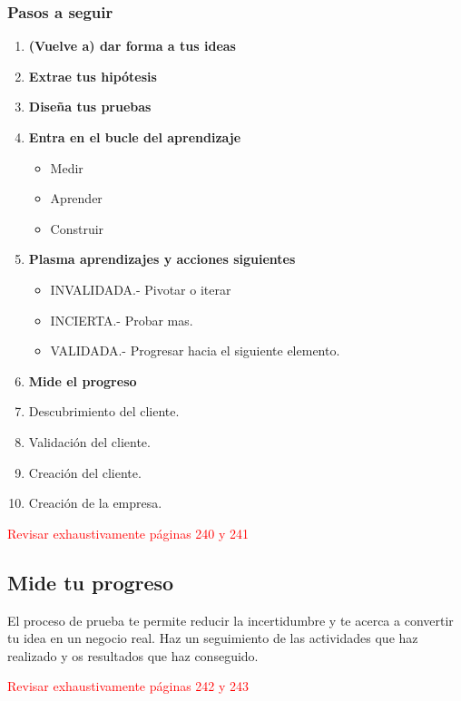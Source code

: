 \documentclass[11pt]{book}
\begin{document}
\subsubsection{Pasos a seguir}
\begin{enumerate}
\item \textbf{ (Vuelve a) dar forma a tus ideas }\\

\item \textbf{ Extrae tus hipótesis }\\

\item \textbf{ Diseña tus pruebas }\\

\item \textbf{ Entra en el bucle del aprendizaje }\\
\begin{itemize}
\item Medir
\item Aprender
\item Construir
\end{itemize}
\item \textbf{ Plasma aprendizajes y acciones siguientes }\\
\begin{itemize}
\item INVALIDADA.- Pivotar o iterar
\item INCIERTA.- Probar mas.
\item VALIDADA.- Progresar hacia el siguiente elemento.
\end{itemize}
\item \textbf{ Mide el progreso }\\
\item Descubrimiento del cliente.
\item Validación del cliente.
\item Creación del cliente.
\item Creación de la empresa.
\end{enumerate}
\textcolor{red}{Revisar exhaustivamente páginas 240 y 241}
\subsection{Mide tu progreso}
El proceso de prueba te permite reducir la incertidumbre y te acerca a convertir tu idea en un negocio real.
Haz un seguimiento de las actividades que haz realizado y os resultados que haz conseguido.

\textcolor{red}{Revisar exhaustivamente páginas 242 y 243}
\end{document}
